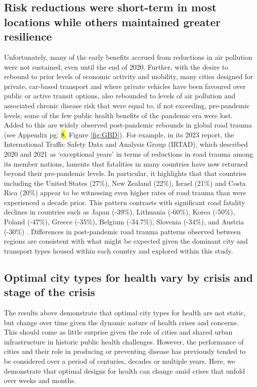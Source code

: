 \documentclass[preprint,10pt]{elsarticle} %
\begin{document}
\subsection*{Risk reductions were short-term in most locations while others maintained greater resilience}
Unfortunately, many of the early benefits accrued from reductions in air pollution were not sustained, even until the end of 2020. Further, with the desire to rebound to prior levels of economic activity and mobility, many cities designed for private, car-based transport and where private vehicles have been favoured over public or active transit options\cite{DAS20211}, also rebounded to levels of air pollution and associated chronic disease risk that were equal to, if not exceeding, pre-pandemic levels; some of the few public health benefits of the pandemic era were lost. Added to this are widely observed post-pandemic rebounds in global road trauma (see Appendix pg. \hl{8}, Figure \ref{fig:GBD}). For example, in its 2023 report, the International Traffic Safety Data and Analysis Group (IRTAD), which described 2020 and 2021 as `exceptional years' in terms of reductions in road trauma among its member nations, laments that fatalities in many countries have now returned beyond their pre-pandemic levels. In particular, it highlights that that countries including the United States (27\%), New Zealand (22\%), Israel (21\%) and Costa Rica (20\%) appear to be witnessing even higher rates of road trauma than were experienced a decade prior. This pattern contrasts with significant road fatality declines in countries such as Japan (-39\%), Lithuania (-60\%), Korea (-50\%), Poland (-47\%), Greece (-35\%), Belgium (-34.7\%), Slovenia (-34\%), and Austria (-30\%) \cite{ITFRS2022,ITFRS2023}. Differences in post-pandemic road trauma patterns observed between regions are consistent with what might be expected given the dominant city and transport types housed within each country and explored within this study.

\subsection*{Optimal city types for health vary by crisis and stage of the crisis}

The results above demonstrate that optimal city types for health are not static, but change over time given the dynamic nature of health crises and concerns. This should come as little surprise given the role of cities and shared urban infrastructure in historic public health challenges. However, the performance of cities and their role in producing or preventing disease has previously tended to be considered over a period of centuries, decades or multiple years. Here, we demonstrate that optimal designs for health can change amid crises that unfold over weeks and months.
\end{document}
